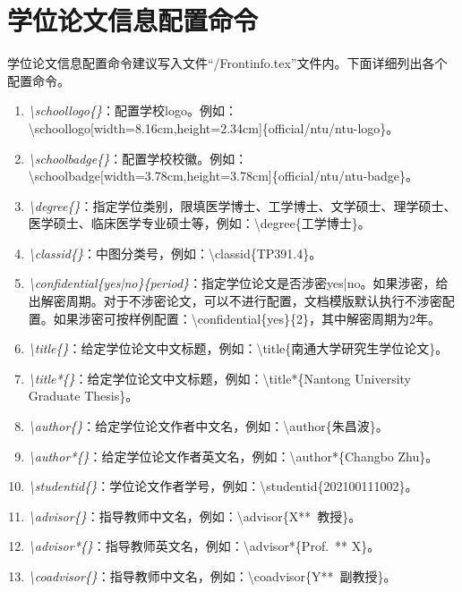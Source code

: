  \section{\projectname 学位论文信息配置命令}
 学位论文信息配置命令建议写入文件“\projectname /Frontinfo.tex”文件内。下面详细列出各个配置命令。
 \begin{enumerate}
    \item \emph{\backslash schoollogo\{\}}：配置学校logo。例如：\newline \backslash schoollogo[width=8.16cm,height=2.34cm]\{official/ntu/ntu-logo\}。
    \item \emph{\backslash schoolbadge\{\}}：配置学校校徽。例如：\newline \backslash schoolbadge[width=3.78cm,height=3.78cm]\{official/ntu/ntu-badge\}。
    \item \emph{\backslash degree\{\}}：指定学位类别，限填医学博士、工学博士、文学硕士、理学硕士、医学硕士、临床医学专业硕士等，例如：\backslash degree\{工学博士\}。
    \item \emph{\backslash classid\{\}}：中图分类号，例如：\backslash classid\{TP391.4\}。
    \item \emph{\backslash confidential\{yes|no\}\{period\}}：指定学位论文是否涉密yes|no。如果涉密，给出解密周期。对于不涉密论文，可以不进行配置，文档模版默认执行不涉密配置。如果涉密可按样例配置：\backslash confidential\{yes\}\{2\}，其中解密周期为2年。
    \item \emph{\backslash title\{\}}：给定学位论文中文标题，例如：\backslash title\{南通大学研究生学位论文\}。
    \item \emph{\backslash title*\{\}}：给定学位论文中文标题，例如：\backslash title*\{Nantong University Graduate Thesis\}。
    \item \emph{\backslash author\{\}}：给定学位论文作者中文名，例如：\backslash author\{朱昌波\}。
    \item \emph{\backslash author*\{\}}：给定学位论文作者英文名，例如：\backslash author*\{Changbo Zhu\}。
    \item \emph{\backslash studentid\{\}}：学位论文作者学号，例如：\backslash studentid\{202100111002\}。
    \item \emph{\backslash advisor\{\}}：指导教师中文名，例如：\backslash advisor\{X**~教授\}。
    \item \emph{\backslash advisor*\{\}}：指导教师英文名，例如：\backslash advisor*\{Prof.~** X\}。
    \item \emph{\backslash coadvisor\{\}}：指导教师中文名，例如：\backslash coadvisor\{Y**~副教授\}。

\end{enumerate}
